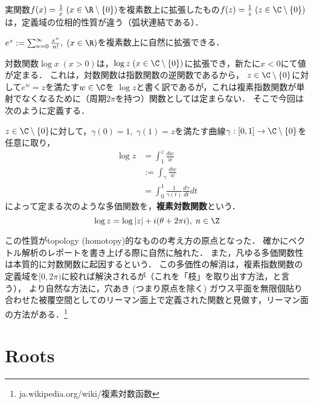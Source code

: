 \documentclass[uplatex, dvipdfmx]{jsreport}
\begin{document}
\begin{example*}[定義域の位相的性質が変わる]
    実関数$f(x)=\frac{1}{x}\;(x\in\R\setminus\{0\})$を複素数上に拡張したもの$f(z)=\frac{1}{z}\;(z\in\C\setminus\{0\})$は，定義域の位相的性質が違う（弧状連結である）．
\end{example*}
\begin{example*}
    $e^x:=\sum^{\infty}_{n=0}\frac{x^n}{n!},\;(x\in\R)$を複素数上に自然に拡張できる．
\end{example*}
\begin{example*}[新しく考慮可能になる値が出現する]
    対数関数$\log x\;(x>0)$は，$\log z\;(x\in\C\setminus\{0\})$に拡張でき，新たに$x<0$にて値が定まる．
    これは，対数関数は指数関数の逆関数であるから，
    $z\in\C\setminus\{0\}$に対して$e^w=z$を満たす$w\in\C$を
    $\log z$と書く訳であるが，これは複素指数関数が単射でなくなるために（周期$2\pi$を持つ）関数としては定まらない．
    そこで今回は次のように定義する．

    \begin{definition*}
        $z\in\C\setminus\{0\}$に対して，$\gamma(0)=1,\;\gamma(1)=z$を満たす曲線$\gamma:[0,1]\to\C\setminus\{0\}$を
        任意に取り，
        \begin{align*}
            \log z&=\int^z_1\frac{dw}{w}\\
            &:= \int_\gamma\frac{dw}{w}\\
            &=\int^1_0\frac{1}{\gamma(t)}\frac{d\gamma}{dt}dt
        \end{align*}
        によって定まる次のような多価関数を，\textbf{複素対数関数}という．
        \[ \log z=\log|z| + i(\theta+2\pi i),\;n\in\Z \]
    \end{definition*}
    \begin{remark*}
        この性質がtopology (homotopy)的なものの考え方の原点となった．
        確かにベクトル解析のレポートを書き上げる際に自然に触れた．
        また，凡ゆる多価関数性は本質的に対数関数に起因するという．
        この多価性の解消は，複素指数関数の定義域を$[0,2\pi)$に絞れば解決されるが（これを「枝」を取り出す方法，と言う），
        より自然な方法に，穴あき (つまり原点を除く) ガウス平面を無限個貼り合わせた被覆空間としてのリーマン面上で定義された関数と見做す，リーマン面の方法がある．\footnote{ja.wikipedia.org/wiki/複素対数函数}
    \end{remark*}
\end{example*}

\section{Roots}
\end{document}
